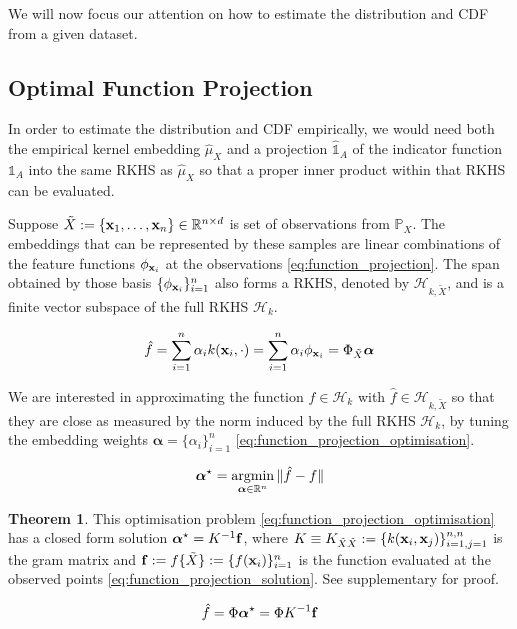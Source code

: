 \documentclass[twoside]{article} \usepackage{aistats2017}
\theoremstyle{definition}
\newtheorem{theorem}{Theorem}[section]
\newcommand{\argmin}{\operatornamewithlimits{argmin}}
\newcommand{\rv}[1]{{#1}}
\newcommand{\ds}[1]{\tilde{#1}}
\begin{document}
	We will now focus our attention on how to estimate the distribution and CDF from a given dataset.
	
	\subsection{Optimal Function Projection}
	\label{sec:discriminative_quantile_regression:optimal_function_approximation}
	
		In order to estimate the distribution and CDF empirically, we would need both the empirical kernel embedding $\hat{\mu}_{\rv{X}}$ and a projection $\hat{\mathbb{1}}_{A}$ of the indicator function $\mathbb{1}_{A}$ into the same RKHS as $\hat{\mu}_{\rv{X}}$ so that a proper inner product within that RKHS can be evaluated.

		Suppose $\ds{X} := \{\bvec{x}_{1}, \dots, \bvec{x}_{n}\} \in \mathbb{R}^{n \times d}$ is set of observations from $\mathbb{P}_{\rv{X}}$. The embeddings that can be represented by these samples are linear combinations of the feature functions $\phi_{\mathbf{x}_{i}}$ at the observations \eqref{eq:function_projection}. The span obtained by those basis $\{\phi_{\mathbf{x}_{i}}\}_{i = 1}^{n}$ also forms a RKHS, denoted by $\mathcal{H}_{k, \ds{X}}$, and is a finite vector subspace of the full RKHS $\mathcal{H}_{k}$.
		
		\begin{equation}
			\hat{f} = \sum_{i = 1}^{n} \alpha_{i} k(\bvec{x}_{i}, \cdot) = \sum_{i = 1}^{n} \alpha_{i} \phi_{\bvec{x}_{i}} = \Phi_{\ds{X}} \bm{\alpha}
		\label{eq:function_projection}
		\end{equation}
	
		We are interested in approximating the function $f \in \mathcal{H}_{k}$ with $\hat{f} \in \mathcal{H}_{k, \ds{X}}$ so that they are close as measured by the norm induced by the full RKHS $\mathcal{H}_{k}$, by tuning the embedding weights $\bm{\alpha} = \{\alpha_{i}\}_{i = 1}^{n}$ \eqref{eq:function_projection_optimisation}.
			
		\begin{equation}
			\bm{\alpha}^{\star} = \argmin_{\bm{\alpha} \in \mathbb{R}^{n}} \Vert \hat{f} - f \Vert
		\label{eq:function_projection_optimisation}
		\end{equation}
		
		\begin{theorem} \label{thm:function_projection_solution}
			This optimisation problem \eqref{eq:function_projection_optimisation} has a closed form solution $\bm{\alpha}^{\star} = K^{-1} \mathbf{f}$, where $K \equiv K_{\ds{X} \ds{X}} := \{k(\bvec{x}_{i}, \bvec{x}_{j})\}_{i = 1, j = 1}^{n, n}$ is the gram matrix and $\bvec{f} := f\{\ds{X}\} := \{f(\bvec{x}_{i})\}_{i = 1}^{n}$ is the function evaluated at the observed points \eqref{eq:function_projection_solution}. See supplementary for proof.
			
			\begin{equation}
				\hat{f} = \Phi \bm{\alpha}^{\star} = \Phi K^{-1} \mathbf{f}
			\label{eq:function_projection_solution}
			\end{equation}
		\end{theorem}
		
\end{document}
